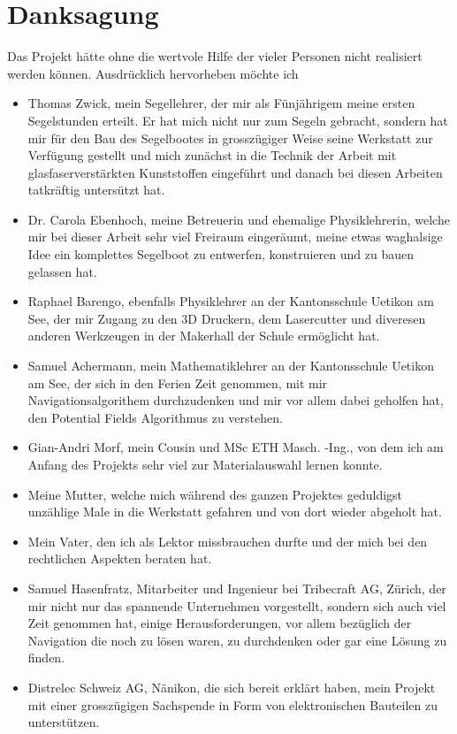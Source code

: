 

\chapter{Danksagung}
\label{chap:danksagung}
Das Projekt hätte ohne die wertvole Hilfe der vieler Personen nicht realisiert werden können. Ausdrücklich hervorheben möchte ich
\begin{itemize}
\item Thomas Zwick, mein Segellehrer, der mir als Fünjährigem meine ersten Segelstunden erteilt. Er hat mich nicht nur zum  Segeln gebracht, sondern hat mir für den Bau des Segelbootes in grosszügiger Weise seine Werkstatt zur Verfügung gestellt und mich zunächst in die Technik der Arbeit mit glasfaserverstärkten Kunststoffen eingeführt und danach bei diesen Arbeiten tatkräftig untersützt hat.
 \item Dr. Carola Ebenhoch, meine Betreuerin und ehemalige Physiklehrerin, welche mir bei dieser Arbeit sehr viel Freiraum eingeräumt, meine etwas waghalsige Idee ein komplettes Segelboot zu entwerfen, konstruieren und zu bauen gelassen hat.
  \item Raphael Barengo, ebenfalls Physiklehrer an der Kantonsschule Uetikon am See, der mir Zugang zu den 3D Druckern, dem Lasercutter und diveresen anderen Werkzeugen in der Makerhall der Schule ermöglicht hat.  
  \item Samuel Achermann, mein Mathematiklehrer an der Kantonsschule Uetikon am See, der sich in den Ferien Zeit genommen, mit mir Navigationsalgorithem durchzudenken und mir vor allem dabei geholfen hat, den Potential Fields Algorithmus zu verstehen.
  
  \item Gian-Andri Morf, mein Cousin und MSc ETH Masch. -Ing., von dem ich am Anfang des Projekts sehr viel zur Materialauswahl lernen konnte.
  \item Meine Mutter, welche mich während des ganzen Projektes geduldigst unzählige Male in die Werkstatt gefahren und von dort wieder abgeholt hat.
  \item  Mein Vater, den ich als Lektor missbrauchen durfte und der mich bei den rechtlichen Aspekten beraten hat.
   \item Samuel Hasenfratz, Mitarbeiter und Ingenieur bei Tribecraft AG, Zürich, der mir nicht nur das spannende Unternehmen vorgestellt, sondern sich auch viel Zeit genommen hat, einige Herausforderungen, vor allem bezüglich der Navigation die noch zu lösen waren, zu durchdenken oder gar eine Lösung zu finden. 
\item Distrelec Schweiz AG, Nänikon, die sich bereit erklärt haben, mein Projekt mit einer grosszügigen Sachspende in Form von elektronischen Bauteilen zu unterstützen. 
 
\end{itemize}
